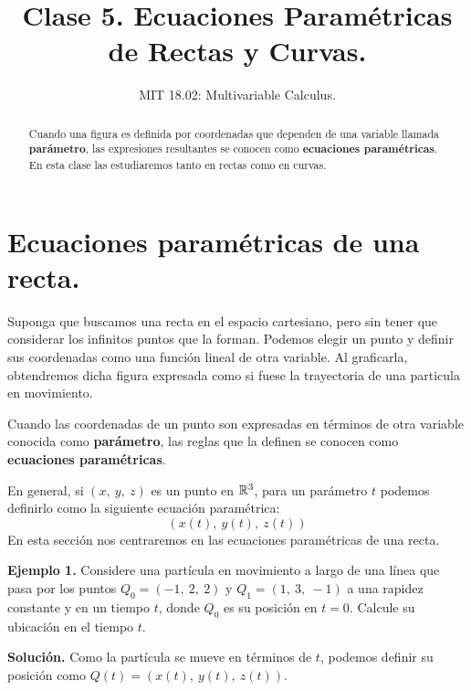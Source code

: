 \documentclass[12pt]{article}
\title{Clase 5. Ecuaciones Paramétricas de Rectas y Curvas.}
\author{MIT 18.02: Multivariable Calculus.}
\date{}
\begin{document}


\maketitle

\begin{abstract}
\noindent Cuando una figura es definida por coordenadas que dependen de una variable llamada \textbf{parámetro}, las expresiones resultantes se conocen como \textbf{ecuaciones paramétricas}. En esta clase las estudiaremos tanto en rectas como en curvas.
\end{abstract}


\section{Ecuaciones paramétricas de una recta.}

Suponga que buscamos una recta en el espacio cartesiano, pero sin tener que considerar los infinitos puntos que la forman. Podemos elegir un punto y definir sus coordenadas como una función lineal de otra variable. Al graficarla, obtendremos dicha figura expresada como si fuese la trayectoria de una particula en movimiento.

Cuando las coordenadas de un punto son expresadas en términos de otra variable conocida como \textbf{parámetro}, las reglas que la definen se conocen como \textbf{ecuaciones paramétricas}.

En general, si $(x, \ y, \ z)$ es un punto en $\mathbb{R}^{3}$, para un parámetro $t$ podemos definirlo como la siguiente ecuación paramétrica:
\[
  (x(t), \ y(t), \ z(t))
\]
En esta sección nos centraremos en las ecuaciones paramétricas de una recta.

\textbf{Ejemplo 1.} Considere una partícula en movimiento a largo de una línea que pasa por los puntos $Q_{0} = (-1, \ 2, \ 2)$ y $Q_{1} = (1, \ 3, \ -1)$ a una rapidez constante y en un tiempo $t$, donde $Q_{0}$ es su posición en $t = 0$. Calcule su ubicación en el tiempo $t$.

\textbf{Solución.} Como la partícula se mueve en términos de $t$, podemos definir su posición como $Q(t) = (x(t), \ y(t), \ z(t))$.
\end{document}
